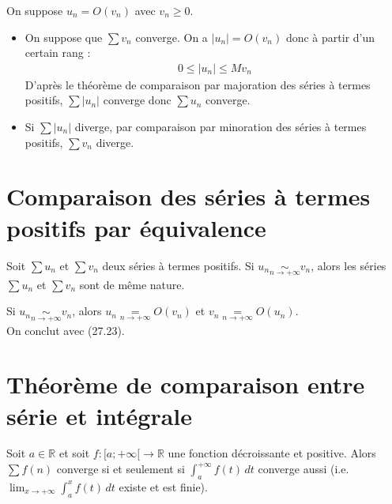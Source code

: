 \documentclass[../main.tex]{subfiles}
\begin{document}
\noindent On suppose $u_n = O(v_n)$ avec $v_n \geq 0$. 
\begin{itemize}
    \item On suppose que $\sum v_n$ converge. On a $|u_n| = O(v_n)$ donc à partir d'un certain rang : 
    \begin{align*}
        0 \leq |u_n| \leq M v_n
    \end{align*}
    D'après le théorème de comparaison par majoration des séries à termes positifs, $\sum |u_n|$ converge donc $\sum u_n$ converge.

    \item Si $\sum |u_n|$ diverge, par comparaison par minoration des séries à termes positifs, $\sum v_n$ diverge. 
\end{itemize}

\section{Comparaison des séries à termes positifs par équivalence}
\begin{tcolorbox}[title=Théorème 27.24, title filled=false, colframe=orange, colback=orange!10!white]
    Soit $\sum u_n$ et $\sum v_n$ deux séries à termes positifs. Si $u_n \underset{n\to +\infty}{\sim} v_n$, alors les séries $\sum u_n$ et $\sum v_n$ sont de même nature.
\end{tcolorbox}

\noindent Si $u_n \underset{n\to +\infty}{\sim} v_n$, alors $u_n \underset{n\to +\infty}{=} O(v_n)$ et $v_n \underset{n\to +\infty}{=} O(u_n)$. \\
On conclut avec (27.23). 

\section{Théorème de comparaison entre série et intégrale}
\begin{tcolorbox}[title=Théorème 27.25, title filled=false, colframe=orange, colback=orange!10!white]
    Soit $a\in \mathbb{R}$ et soit $f:[a; +\infty[\to \mathbb{R}$ une fonction décroissante et positive. Alors $\sum f(n)$ converge si et seulement si $\int_a^{+\infty} f(t) \,dt$ converge aussi (i.e. $\lim_{x\to +\infty} \int_{a}^{x} f(t) \,dt$ existe et est finie).
\end{tcolorbox}
\end{document}
